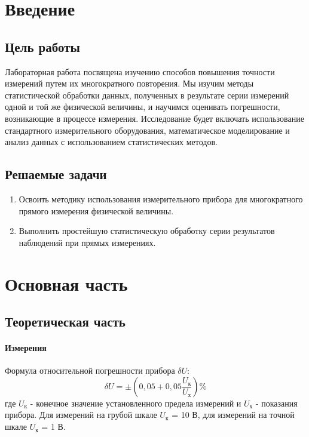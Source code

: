 

\section{Введение}
\subsection{Цель работы}
Лабораторная работа посвящена изучению способов повышения точности измерений путем их многократного повторения. Мы изучим методы статистической обработки данных, полученных в результате серии измерений одной и той же физической величины, и научимся оценивать погрешности, возникающие в процессе измерения. Исследование будет включать использование стандартного измерительного оборудования, математическое моделирование и анализ данных с использованием статистических методов.

\subsection{Решаемые задачи}
\begin{enumerate}
  \item Освоить методику использования измерительного прибора для
многократного прямого измерения физической величины.
  \item Выполнить простейшую статистическую обработку серии
результатов наблюдений при прямых измерениях.
\end{enumerate}

\section{Основная часть}

\subsection{Теоретическая часть}

\paragraph{Измерения}
Формула относительной погрешности прибора $\delta U$:
\begin{equation}
  \delta U = \pm (0,05 + 0,05  \frac{U_{\text{к}}}{U_{\text{х}}})\%
\end{equation}
где $U_{\text{к}}$ - конечное значение установленного предела измерений и $U_{\text{х}}$ - показания прибора. Для измерений на грубой шкале $U_{\text{к}}$ = 10 В, для измерений на точной шкале $U_{\text{к}}$ = 1 В.

